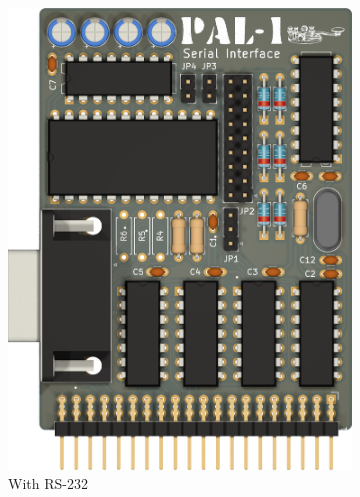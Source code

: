 \documentclass[a4paper,11pt,twoside,openright]{report}
\begin{document}
\begin{figure}[!tbp]
  \begin{subfigure}[b]{0.45\textwidth}
    \includegraphics[width=\textwidth]{figures/serial-alt-1.png}
    \caption{With RS-232}
  \end{subfigure}
  \hfill
  \begin{subfigure}[b]{0.45\textwidth}

\end{subfigure}
\end{figure}
\end{document}
